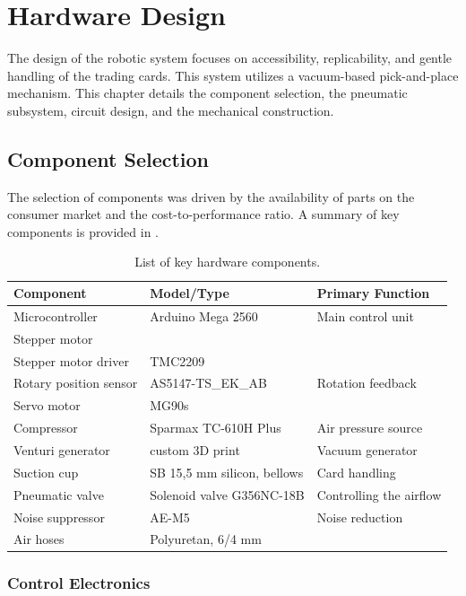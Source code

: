 \chapter{Hardware Design}\label{chap:hw}
The design of the robotic system focuses on accessibility, replicability, and gentle handling of the trading cards. 
This system utilizes a vacuum-based pick-and-place mechanism. This chapter details the component selection, the 
pneumatic subsystem, circuit design, and the mechanical construction.

\section{Component Selection} %
The selection of components was driven by the availability of parts on the consumer market and the cost-to-performance 
ratio. A summary of key components is provided in 
.
\begin{table}[!h]
    \centering
    \caption{List of key hardware components.}
    \label{tab:components}
    \begin{tabular}{l|l|l}
        \textbf{Component} & \textbf{Model/Type} & \textbf{Primary Function} \\ \hline
        Microcontroller & Arduino Mega 2560 & Main control unit \\
        Stepper motor & & \\
        Stepper motor driver & TMC2209 & \\
        Rotary position sensor & AS5147-TS\_EK\_AB & Rotation feedback \\
        Servo motor & MG90s & \\
        Compressor & Sparmax TC-610H Plus & Air pressure source \\
        Venturi generator & custom 3D print & Vacuum generator \\
        Suction cup & SB 15,5 mm silicon, bellows & Card handling \\
        Pneumatic valve & Solenoid valve G356NC-18B & Controlling the airflow \\
        Noise suppressor & AE-M5 & Noise reduction \\
        Air hoses & Polyuretan, 6/4 mm & 
    \end{tabular}
\end{table}

\subsection{Control Electronics}

